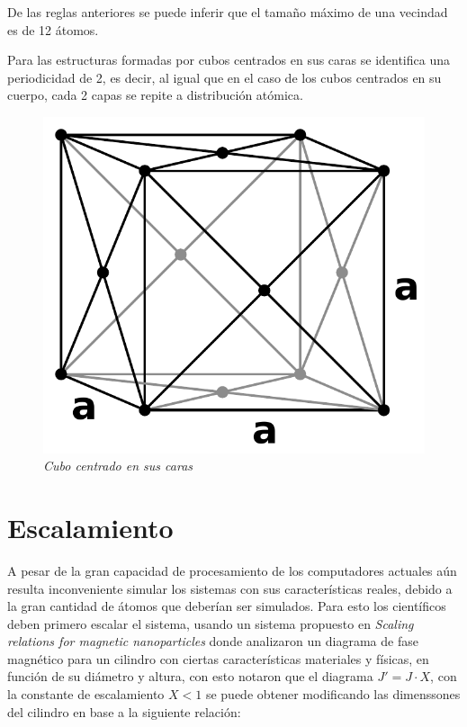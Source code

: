 De las reglas anteriores se puede inferir que el tamaño máximo de una vecindad es de 12 átomos.

Para las estructuras formadas por cubos centrados en sus caras se identifica una periodicidad de 2, es decir, al igual que en el caso de los cubos centrados en su cuerpo, cada 2 capas se repite a distribución atómica.

\begin{figure}[H]
  \centering
  \includegraphics[scale=.6]{images/FaceCenteredCubic}
  \caption{\em Cubo centrado en sus caras}
\end{figure}

\section{Escalamiento}

A pesar de la gran capacidad de procesamiento de los computadores actuales aún resulta inconveniente simular los sistemas con sus características reales, debido a la gran cantidad de átomos que deberían ser simulados. Para esto los científicos deben primero escalar el sistema, usando un sistema propuesto en \emph{Scaling relations for magnetic nanoparticles} \citep{PhysRevB.71.094435} donde analizaron un diagrama de fase magnético para un cilindro con ciertas características materiales y físicas, en función de su diámetro y altura, con esto notaron que el diagrama $J' = J \cdot X$, con la constante de escalamiento $X < 1$ se puede obtener modificando las dimenssones del cilindro en base a la siguiente relación:

